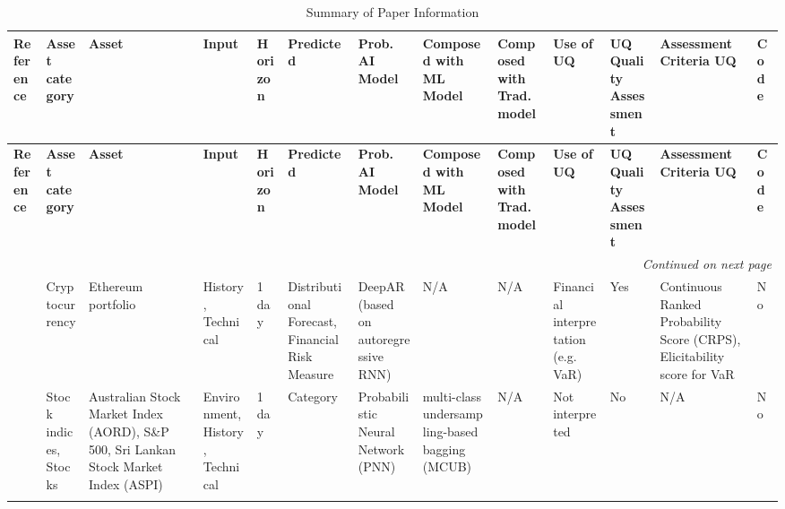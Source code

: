 \scriptsize %
\setlength\LTcapwidth{\textheight} %

\begin{landscape}
\begin{longtable}{p{0.07\textheight} p{0.07\textheight} p{0.16\textheight} p{0.07\textheight} p{0.07\textheight} p{0.07\textheight} p{0.14\textheight} p{0.07\textheight} p{0.07\textheight} p{0.07\textheight} p{0.07\textheight} p{0.1\textheight} p{0.04\textheight}}
        \caption[Descriptive table of all papers in sample]{Summary of Paper Information}
        \label{table:paper_info_summary} \\
        \toprule
        \textbf{Reference} & \textbf{Asset category} & \textbf{Asset} & \textbf{Input} & \textbf{Horizon} & \textbf{Predicted} & \textbf{Prob. AI Model} & \textbf{Composed with ML Model} & \textbf{Composed with Trad. model} & \textbf{Use of UQ} & \textbf{UQ Quality Assessment} & \textbf{Assessment Criteria UQ} & \textbf{Code} \\
        \midrule
        \endfirsthead

        \toprule
        \textbf{Reference} & \textbf{Asset category} & \textbf{Asset} & \textbf{Input} & \textbf{Horizon} & \textbf{Predicted} & \textbf{Prob. AI Model} & \textbf{Composed with ML Model} & \textbf{Composed with Trad. model} & \textbf{Use of UQ} & \textbf{UQ Quality Assessment} & \textbf{Assessment Criteria UQ} & \textbf{Code} \\
        \midrule
        \endhead

        \midrule
        \multicolumn{13}{r}{\textit{Continued on next page}} \\
        \midrule
        \endfoot

        \bottomrule
        \endlastfoot

         \textcite{Almeida2024RiskForecasting} & Cryptocurrency & Ethereum portfolio & History, Technical & 1 day & Distributional Forecast, Financial Risk Measure & DeepAR (based on autoregressive RNN) & N/A & N/A & Financial interpretation (e.g. VaR) & Yes & Continuous Ranked Probability Score (CRPS), Elicitability score for VaR & No \\
        \addlinespace
        \hdashline[0.2pt/3pt]
        \addlinespace
        
        \textcite{Chandrasekara2019pnn} & Stock indices, Stocks & Australian Stock Market Index (AORD), S\&P 500, Sri Lankan Stock Market Index (ASPI) & Environment, History, Technical & 1 day & Category & Probabilistic Neural Network (PNN) & multi-class undersampling-based bagging (MCUB) & N/A & Not interpreted & No & N/A & No \\
        \addlinespace
        \hdashline[0.2pt/3pt]
        \addlinespace
        

\end{longtable}
\end{landscape}
